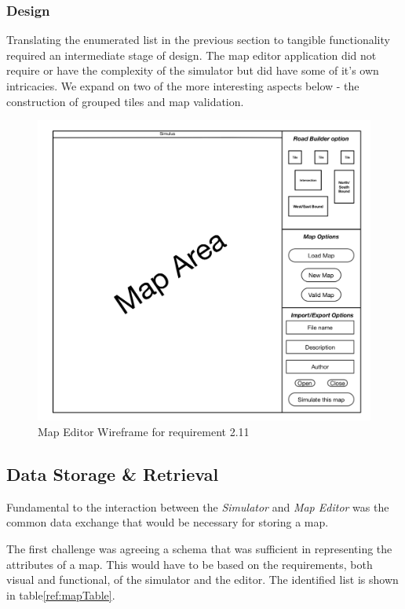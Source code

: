 \subsubsection{Design}
Translating the enumerated list in the previous section to tangible functionality required an intermediate stage of design. The map editor application did not require or have the complexity of the simulator but did have some of it's own intricacies. We expand on two of the more interesting aspects below - the construction of grouped tiles and map validation.

\begin{figure}[h]
	\begin{center}
		\includegraphics{img/Map_Editor_Wireframe.png}
		\caption{Map Editor Wireframe for requirement 2.11}
		\label{fig:editorwireframe}
	\end{center}
\end{figure}
\pagebreak

\subsection{Data Storage \& Retrieval}\label{ss:xml}
Fundamental to the interaction between the \textit{Simulator} and \textit{Map Editor} was the common data exchange that would be necessary for storing a map.

The first challenge was agreeing a schema that was sufficient in representing the attributes of a map. This would have to be based on the requirements, both visual and functional, of the simulator and the editor. The identified list is shown in table\ref{ref:mapTable}. 

